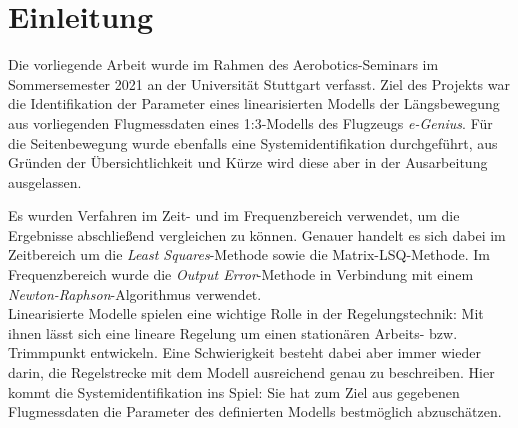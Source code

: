 \chapter{Einleitung}

Die vorliegende Arbeit wurde im Rahmen des Aerobotics-Seminars im Sommersemester 2021 an der Universität Stuttgart verfasst. 
Ziel des Projekts war die Identifikation der Parameter eines linearisierten Modells der Längsbewegung aus vorliegenden 
Flugmessdaten eines 1:3-Modells des Flugzeugs \textit{e-Genius}. Für die Seitenbewegung wurde ebenfalls eine 
Systemidentifikation durchgeführt, aus Gründen der Übersichtlichkeit und Kürze wird diese aber in der Ausarbeitung 
ausgelassen.\par
Es wurden Verfahren im Zeit- und im Frequenzbereich verwendet, um die Ergebnisse abschließend vergleichen zu können. Genauer 
handelt es sich dabei im Zeitbereich um die \textit{Least Squares}-Methode sowie die Matrix-LSQ-Methode. Im Frequenzbereich 
wurde die \textit{Output Error}-Methode in Verbindung mit einem \textit{Newton-Raphson}-Algorithmus verwendet.\\

Linearisierte Modelle spielen eine wichtige Rolle in der Regelungstechnik: Mit ihnen lässt sich eine lineare Regelung um 
einen stationären Arbeits- bzw. Trimmpunkt entwickeln. Eine Schwierigkeit besteht dabei aber immer wieder darin, die 
Regelstrecke mit dem Modell ausreichend genau zu beschreiben. Hier kommt die Systemidentifikation ins Spiel: Sie hat zum Ziel 
aus gegebenen Flugmessdaten die Parameter des definierten Modells bestmöglich abzuschätzen.

